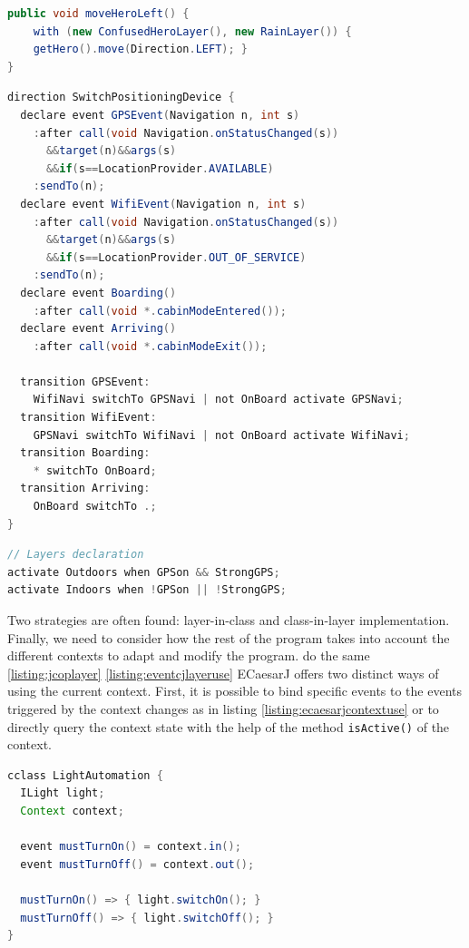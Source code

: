 \documentclass[a4paper]{article}
\begin{document}
 
\begin{lstlisting}[float, language=Java, caption=JCop layer activation, label={listing:jcopwith}]
public void moveHeroLeft() {
	with (new ConfusedHeroLayer(), new RainLayer()) {
    getHero().move(Direction.LEFT); }
}
\end{lstlisting}

\begin{lstlisting}[float, language=Java, caption=EventCJ layer activation, label={listing:eventcjevent}]
direction SwitchPositioningDevice {
  declare event GPSEvent(Navigation n, int s)
    :after call(void Navigation.onStatusChanged(s))
      &&target(n)&&args(s)
      &&if(s==LocationProvider.AVAILABLE)
    :sendTo(n);
  declare event WifiEvent(Navigation n, int s)
    :after call(void Navigation.onStatusChanged(s))
      &&target(n)&&args(s)
      &&if(s==LocationProvider.OUT_OF_SERVICE)
    :sendTo(n);
  declare event Boarding()
    :after call(void *.cabinModeEntered());
  declare event Arriving()
    :after call(void *.cabinModeExit());
  
  transition GPSEvent:
    WifiNavi switchTo GPSNavi | not OnBoard activate GPSNavi;
  transition WifiEvent:
    GPSNavi switchTo WifiNavi | not OnBoard activate WifiNavi;
  transition Boarding:
    * switchTo OnBoard;
  transition Arriving:
    OnBoard switchTo .;
}
\end{lstlisting}

\begin{lstlisting}[float, language=Java, caption=Javanese context declaration, label={listing:javaneselayer}]
// Layers declaration
activate Outdoors when GPSon && StrongGPS;
activate Indoors when !GPSon || !StrongGPS;
\end{lstlisting}

Two strategies are often found: layer-in-class and class-in-layer implementation.
Finally, we need to consider how the rest of the program takes into account the different contexts to adapt and modify the program. \cite{jcop} \cite{eventcj} do the same \ref{listing:jcoplayer} \ref{listing:eventcjlayeruse}
ECaesarJ offers two distinct ways of using the current context. First, it is possible to bind specific events to the events triggered by the context changes as in listing \ref{listing:ecaesarjcontextuse} or to directly query the context state with the help of the method \lstinline|isActive()| of the context.

\begin{lstlisting}[float, language=Java, caption=ECaesarJ context use, label={listing:ecaesarjcontextuse}]
cclass LightAutomation {
  ILight light;
  Context context;

  event mustTurnOn() = context.in();
  event mustTurnOff() = context.out();

  mustTurnOn() => { light.switchOn(); }
  mustTurnOff() => { light.switchOff(); }
}
\end{lstlisting}
\end{document}
